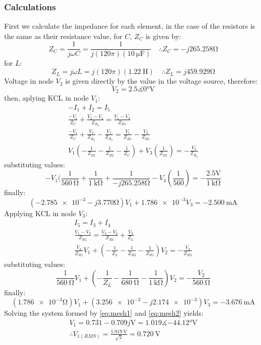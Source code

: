 \documentclass[letterpaper]{article}
\begin{document}
\subsubsection{Calculations}
First we calculate the impedance for each element, in the case of the resistors is the same as their
resistance value, for $C$, $Z_C$ is given by:
\[Z_C = \frac{1}{j\omega C} = \frac{1}{j(120\pi)(\SI{10}{\micro\farad})}\quad\therefore Z_C =
-j265.258\si{\ohm}\]
for $L$:
\[Z_L = j\omega L = j(120 \pi)(\SI{1.22}{\henry})\quad\therefore Z_L = j459.929\si{\ohm}\]
Voltage in node $V_2$ is given directly by the value in the voltage source, therefore:
\[V_2 = 2.5\measuredangle\ang{0}\si{\volt}\]
then, aplying KCL in node $V_1$:
\begin{gather*}
    -I_1+I_2 = I_5\\
    \frac{-V_1}{Z_C}+\frac{V_2-V_1}{Z_{R_2}} = \frac{V_1-V_3}{Z_{R1}}\\
    \frac{-V_1}{Z_C}+\frac{V_2}{Z_{R_2}}-\frac{V_1}{Z_{R_2}} =
    \frac{V_1}{Z_{R1}}-\frac{V_3}{Z_{R1}}\\
    V_1(-\frac{1}{Z_{R1}}-\frac{1}{Z_{R2}}-\frac{1}{Z_C})+V_3(\frac{1}{Z_{R1}}) = -\frac{V_2}{Z_{R_2}}
\end{gather*}
substituting values:
\[-V_1(\frac{1}{\SI{560}{\ohm}}+\frac{1}{\SI{1}{\kilo\ohm}}+\frac{1}{-j265.258\si{\ohm}}-V_3(\frac{1}{560})
= -\frac{2.5\si{\volt}}{\SI{1}{\kilo\ohm}}\]
finally:
\begin{equation}
    (\num{-2.785e-3}-j\num{3.770}\si{\ohm})V_1+\num{1.786e-3}V_3 = \SI{-2.500}{\milli\ampere}
    \label{eq:mesh1}
\end{equation}
Applying KCL in node $V_3$:
\begin{gather*}
    I_5 = I_3+I_4\\
    \frac{V_1-V_3}{Z_{R1}} = \frac{V_3-V_2}{Z_{R3}}+\frac{V_3}{Z_L}\\
    \frac{V_2}{Z_{R1}}V_1+(-\frac{1}{Z_{L}}-\frac{1}{Z_{R3}}-\frac{1}{Z_{R1}})V_2 =
    -\frac{V_2}{Z_{R3}}
\end{gather*}
substituting values:
\[\frac{1}{\SI{560}{\ohm}}V_1+(-\frac{1}{Z_{L}}-\frac{1}{\SI{680}{\ohm}}-\frac{1}{\SI{1}{\kilo\ohm}})V_2 =
-\frac{V_2}{\SI{560}{\ohm}}\]
finally:
\begin{equation}
    (\num{1.786e-3}\si{\ohm})V_1+(\num{3.256e-3}-j\num{2.174e-3})V_3 = \SI{-3.676}{\milli\ampere}
    \label{eq:mesh2}
\end{equation}
Solving the system formed by \eqref{eq:mesh1} and \eqref{eq:mesh2} yields:
\begin{gather*}
    V_1 = 0.731-0.709j\si{\volt} = 1.019\measuredangle\ang{-44.12}\si{\volt}\\ 
    \therefore V_{1(RMS)} = \frac{\SI{1.019}{\volt}}{\sqrt{2}} = \SI{0.720}{\volt} 
\end{gather*}
\end{document}
